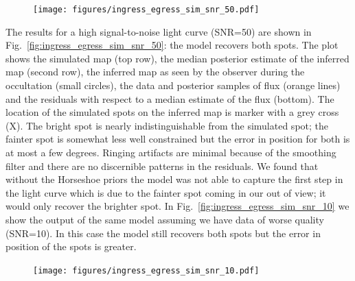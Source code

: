 \documentclass[modern]{aastex62}
\begin{document}
\begin{figure}[t!]
    \begin{centering}
    \texttt{[image: figures/ingress\_egress\_sim\_snr\_50.pdf]}
    \end{centering}
\end{figure}


The results for a high signal-to-noise light curve (SNR=50) are shown in Fig.~\ref{fig:ingress_egress_sim_snr_50}: the model recovers both spots.
The plot shows the simulated map (top row), the median posterior estimate of the inferred map (second row), the inferred map as seen by the observer during the occultation (small circles), the data and posterior samples of flux (orange lines) and the residuals with respect to a median estimate of the flux (bottom). 
The location of the simulated spots on the inferred map is marker with a grey cross (X).
The bright spot is nearly indistinguishable from the simulated spot; the fainter spot is somewhat less well constrained but the error in position for both is at most a few degrees.
Ringing artifacts are minimal because of the smoothing filter and there are no discernible patterns in the residuals.
We found that without the Horseshoe priors the model was not able to capture the first step in the light curve which is due to the fainter spot coming in our out of view; it would only recover the brighter spot.
In Fig.~\ref{fig:ingress_egress_sim_snr_10} we show the output of the same model assuming we have data of worse quality (SNR=10). 
In this case the model still recovers both spots but the error in position of the spots is greater.

\begin{figure}[t!]
    \begin{centering}
        \texttt{[image: figures/ingress\_egress\_sim\_snr\_10.pdf]}
    \end{centering}
\end{figure}
\end{document}
